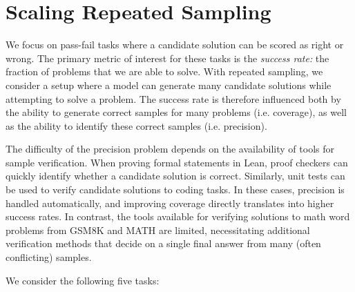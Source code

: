 \documentclass[11pt]{article}
\begin{document}
\section{Scaling Repeated Sampling}
\label{sec:scaling}

We focus on pass-fail tasks where a candidate solution can be scored as right or wrong. The primary metric of interest for these tasks is the \textit{success rate:} the fraction of problems that we are able to solve. With repeated sampling, we consider a setup where a model can generate many candidate solutions while attempting to solve a problem. The success rate is therefore influenced both by the ability to generate correct samples for many problems (i.e. coverage), as well as the ability to identify these correct samples (i.e. precision).

The difficulty of the precision problem depends on the availability of tools for sample verification. When proving formal statements in Lean, proof checkers can quickly identify whether a candidate solution is correct. Similarly, unit tests can be used to verify candidate solutions to coding tasks. In these cases, precision is handled automatically, and improving coverage directly translates into higher success rates. In contrast, the tools available for verifying solutions to math word problems from GSM8K and MATH are limited, necessitating additional verification methods that decide on a single final answer from many (often conflicting) samples.

We consider the following five tasks:
\end{document}
